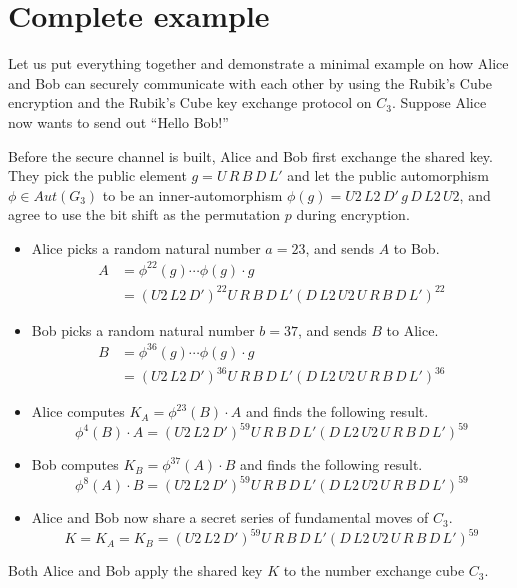 \section{Complete example}
\par Let us put everything together and demonstrate a minimal example on how Alice and Bob can securely communicate with each other by using the Rubik's Cube encryption and the Rubik's Cube key exchange protocol on $C_3$. Suppose Alice now wants to send out ``Hello Bob!''
\par Before the secure channel is built, Alice and Bob first exchange the shared key. They pick the public element $g = U\,R\,B\,D\,L'$ and let the public automorphism $\phi \in Aut(G_3)$ to be an inner-automorphism $\phi(g) = U2\,L2\,D'\,g\,D\,L2\,U2$, and agree to use the bit shift as the permutation $p$ during encryption.
\begin{itemize}
    \item Alice picks a random natural number $a = 23$, and sends $A$ to Bob.
    \begin{align*}
        A & = \phi^{22}(g) \cdots \phi(g) \cdot g \\
        & = (U2\,L2\,D')^{22}U\,R\,B\,D\,L'(D\,L2\,U2\,U\,R\,B\,D\,L')^{22}
    \end{align*}
    \item Bob picks a random natural number $b = 37$, and sends $B$ to Alice.
    \begin{align*}
        B & = \phi^{36}(g) \cdots \phi(g) \cdot g \\
        & = (U2\,L2\,D')^{36}U\,R\,B\,D\,L'(D\,L2\,U2\,U\,R\,B\,D\,L')^{36}
    \end{align*}
    \item Alice computes $K_A = \phi^{23}(B) \cdot A$ and finds the following result.
    $$\phi^4(B) \cdot A = (U2\,L2\,D')^{59}U\,R\,B\,D\,L'(D\,L2\,U2\,U\,R\,B\,D\,L')^{59}$$
    \item Bob computes $K_B = \phi^{37}(A) \cdot B$ and finds the following result.
    $$\phi^8(A) \cdot B = (U2\,L2\,D')^{59}U\,R\,B\,D\,L'(D\,L2\,U2\,U\,R\,B\,D\,L')^{59}$$
    \item Alice and Bob now share a secret series of fundamental moves of $C_3$.
    $$K = K_A = K_B = (U2\,L2\,D')^{59}U\,R\,B\,D\,L'(D\,L2\,U2\,U\,R\,B\,D\,L')^{59}$$
\end{itemize}
\par Both Alice and Bob apply the shared key $K$ to the number exchange cube $C_3$. 
